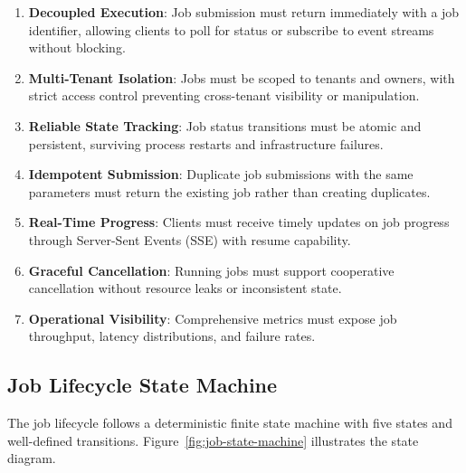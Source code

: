 \begin{enumerate}
    \item \textbf{Decoupled Execution}: Job submission must return immediately with a job identifier, allowing clients to poll for status or subscribe to event streams without blocking.
    
    \item \textbf{Multi-Tenant Isolation}: Jobs must be scoped to tenants and owners, with strict access control preventing cross-tenant visibility or manipulation.
    
    \item \textbf{Reliable State Tracking}: Job status transitions must be atomic and persistent, surviving process restarts and infrastructure failures.
    
    \item \textbf{Idempotent Submission}: Duplicate job submissions with the same parameters must return the existing job rather than creating duplicates.
    
    \item \textbf{Real-Time Progress}: Clients must receive timely updates on job progress through Server-Sent Events (SSE) with resume capability.
    
    \item \textbf{Graceful Cancellation}: Running jobs must support cooperative cancellation without resource leaks or inconsistent state.
    
    \item \textbf{Operational Visibility}: Comprehensive metrics must expose job throughput, latency distributions, and failure rates.
\end{enumerate}

\subsection{Job Lifecycle State Machine}

The job lifecycle follows a deterministic finite state machine with five states and well-defined transitions. Figure~\ref{fig:job-state-machine} illustrates the state diagram.

